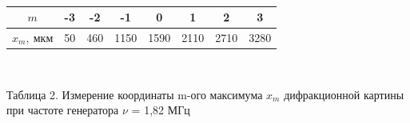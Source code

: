 \

\newline

\begin{center}
\begin{tabular}{|c|c|c|c|c|c|c|c|}
\hline
$m$ &-3&-2&-1&0&1&2&3\\
\hline
$x_m, \ мкм$ &50&460& 1150&1590&2110&2710&3280\\
\hline
\end{tabular}

\

\newline

Таблица 2. Измерение координаты m-ого максимума $x_m$ дифракционной картины при частоте генератора $\nu$ = 1,82 МГц
\end{center}	

\newpage

\

\newline


